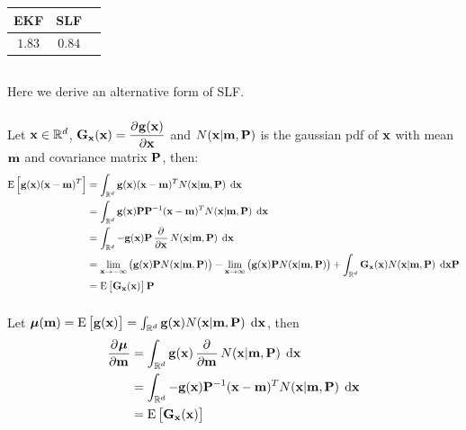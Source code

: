 \documentclass[a4paper,oneside,article]{memoir}
\newcommand{\otoprule}{\midrule[\heavyrulewidth]}
\begin{document}


\begin{table}[h]
	\centering
	\begin{tabular}{c c c}
		\otoprule
		EKF & SLF\\
		\midrule
		$1.83$ & $0.84$\\
		\bottomrule
	\end{tabular}
	\label{table:rmse4_1}
\end{table}






\subsection{}\label{sec:4_2}
Here we derive an alternative form of SLF.
\subsubsection{}\label{sec:4_2a}
Let $\mathbf{x}\in\mathbb{R}^d$, $\v{G}_\v{x}(\v{x})=\dpd{\v{g}(\v{x})}{\v{x}}$ and $N(\mathbf{x}|\mathbf{m},\mathbf{P})$ is the gaussian pdf of $\mathbf{x}$ with mean $\mathbf{m}$ and covariance matrix $\mathbf{P}$, then:
\begin{align}
	\E{\v{g}(\v{x})(\v{x}-\v{m})^T}&=\defint{\R^d}{}{\v{g}(\v{x})(\v{x}-\v{m})^TN(\v{x}|\v{m},\v{P})}{\v{x}}\\
	&=\defint{\R^d}{}{\v{g}(\v{x})\v{P}\v{P}^{-1}(\v{x}-\v{m})^TN(\v{x}|\v{m},\v{P})}{\v{x}}\\
	&=\defint{\R^d}{}{-\v{g}(\v{x})\v{P}\dpd{}{\v{x}}N(\v{x}|\v{m},\v{P})}{\v{x}}\\
	&=\lim_{\v{x}\to-\infty}\left(\v{g}(\v{x})\v{P}N(\v{x}|\v{m},\v{P})\right)-\lim_{\v{x}\to\infty}\left(\v{g}(\v{x})\v{P}N(\v{x}|\v{m},\v{P})\right)+\defint{\R^d}{}{\v{G}_{\v{x}}(\v{x})N(\v{x}|\v{m},\v{P})}{\v{x}}\v{P}\\
	&=\E{\v{G}_{\v{x}}(\v{x})}\v{P}
\end{align}

\subsubsection{}\label{sec:4_2b}
Let $\gv{\mu}(\v{m})=\E{\v{g}(\v{x})}=\defint{\R^d}{}{\v{g}(\v{x})N(\v{x}|\v{m},\v{P})}{\v{x}}$, then
\begin{align}
	\dpd{\gv{\mu}}{\v{m}}&=\defint{\R^d}{}{\v{g}(\v{x})\dpd{}{\v{m}}N(\v{x}|\v{m},\v{P})}{\v{x}}\\
	&=\defint{\R^d}{}{-\v{g}(\v{x})\v{P}^{-1}(\v{x}-\v{m})^TN(\v{x}|\v{m},\v{P})}{\v{x}}\\
	&=\E{\v{G}_{\v{x}}(\v{x})}
\end{align}
\end{document}
